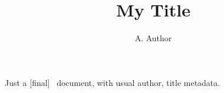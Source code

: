 \documentclass[final]{ltugboat}
\author{A. Author}
\title{My Title}
\begin{document}
\maketitle
Just a [final] \TUB\ document, with usual author, title metadata.
\end{document}
